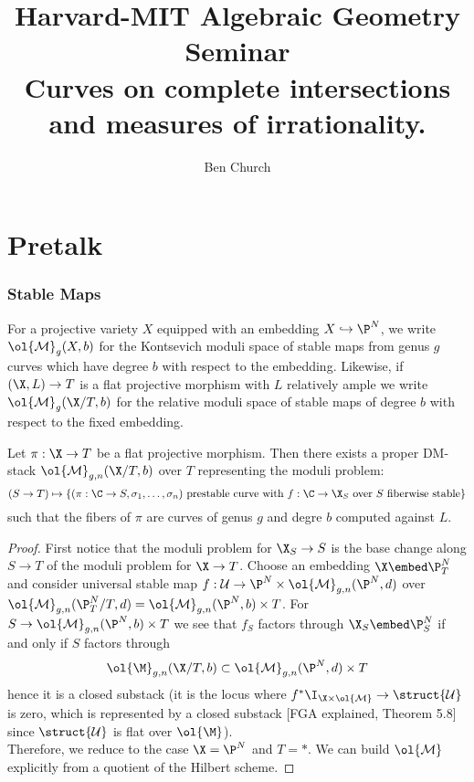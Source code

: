 \documentclass[12pt]{article}
\theoremstyle{plain}
\newcommand{\Mbar}{\ol{\mathcal{M}}}
\begin{document}
\title{Harvard-MIT Algebraic Geometry Seminar \\ \large Curves on complete intersections and measures of irrationality.}
\author{Ben Church}
\maketitle
\tableofcontents

\section*{Pretalk}

\subsubsection{Stable Maps}

For a projective variety $X$ equipped with an embedding $X \hookrightarrow \P^N$, we write $\Mbar_g(X, b)$ for the Kontsevich moduli space of stable maps from genus $g$ curves which have degree $b$ with respect to the embedding. Likewise, if $(\X, L) \to T$ is a flat projective morphism with $L$ relatively ample we write $\Mbar_g(\X / T, b)$ for the relative moduli space of stable maps of degree $b$ with respect to the fixed embedding. 

\begin{thm}
Let $\pi : \X \to T$ be a flat projective morphism. Then there exists a proper DM-stack $\Mbar_{g,n}(\X / T, b)$ over $T$ representing the moduli problem:
\[ (S \to T) \mapsto \{ (\pi : \C \to S, \sigma_1, \dots, \sigma_n) \text{ prestable curve with } f : \C \to \X_S \text{ over } S \text{ fiberwise stable} \} \]
such that the fibers of $\pi$ are curves of genus $g$ and degre $b$ computed against $L$.
\end{thm}

\begin{proof}
First notice that the moduli problem for $\X_S \to S$ is the base change along $S \to T$ of the moduli problem for $\X \to T$. 
Choose an embedding $\X \embed \P^N_T$ and consider universal stable map $f : \mathcal{U} \to \P^N \times \Mbar_{g,n}(\P^N, d)$ over $\Mbar_{g,n}(\P^N_T/T, d) = \Mbar_{g,n}(\P^N, b) \times T$. For $S \to \Mbar_{g,n}(\P^N, b) \times T$ we see that $f_S$ factors through $\X_S \embed \P^N_S$ if and only if $S$ factors through
\[ \ol{\M}_{g,n}(\X/T,b) \subset \Mbar_{g,n}(\P^N, d) \times T \]
hence it is a closed substack (it is the locus where $f^* \I_{\X \times \Mbar} \to \struct{\mathcal{U}}$ is zero, which is represented by a closed substack [FGA explained, Theorem 5.8] since $\struct{\mathcal{U}}$ is flat over $\ol{\M}$). 
\bigskip\\
Therefore, we reduce to the case $\X = \P^N$ and $T = *$. We can build $\Mbar$ explicitly from a quotient of the Hilbert scheme. 
\end{proof}
\end{document}

